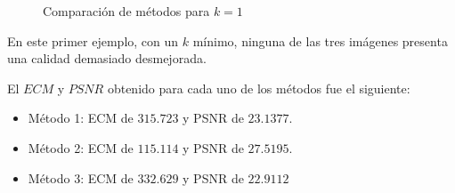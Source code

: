 \begin{figure}[H]
    \centering
    \qquad
    \qquad
    \caption{Comparación de métodos para $k = 1$}
    \label{fig:example}
\end{figure}

En este primer ejemplo, con un $k$ mínimo, ninguna de las tres imágenes presenta una calidad demasiado desmejorada. 

El $ECM$ y $PSNR$ obtenido para cada uno de los métodos fue el siguiente:
\begin{itemize}
 \item Método 1: ECM de $315.723$ y PSNR de $23.1377$.
 \item Método 2: ECM de $115.114$ y PSNR de $27.5195$.
 \item Método 3: ECM de $332.629$ y PSNR de $22.9112$
\end{itemize}

